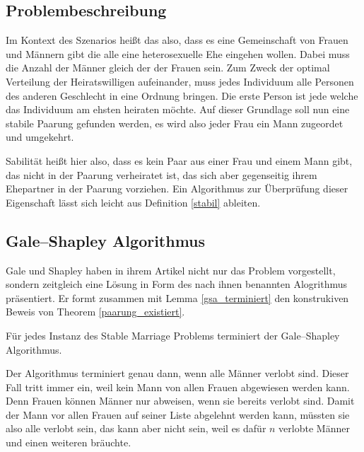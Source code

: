 \subsection{Problembeschreibung}

Im Kontext des Szenarios heißt das also, dass es eine Gemeinschaft von Frauen und Männern gibt die alle eine heterosexuelle Ehe eingehen wollen. Dabei muss die Anzahl der Männer gleich der der Frauen sein. Zum Zweck der optimal Verteilung der Heiratswilligen aufeinander, muss jedes Individuum alle Personen des anderen Geschlecht in eine Ordnung bringen. Die erste Person ist jede welche das Individuum am ehsten heiraten möchte. Auf dieser Grundlage soll nun eine stabile Paarung gefunden werden, es wird also jeder Frau ein Mann zugeordet und umgekehrt.

Sabilität heißt hier also, dass es kein Paar aus einer Frau und einem Mann gibt, das nicht in der Paarung verheiratet ist, das sich aber gegenseitig ihrem Ehepartner in der Paarung vorziehen. Ein Algorithmus zur Überprüfung dieser Eigenschaft lässt sich leicht aus Definition \ref{stabil} ableiten.



\subsection{Gale–Shapley Algorithmus}

Gale und Shapley haben in ihrem Artikel \cite{Gale:1962} nicht nur das Problem vorgestellt, sondern zeitgleich eine Lösung in Form des nach ihnen benannten Alogrithmus präsentiert. Er formt zusammen mit Lemma \ref{gsa_terminiert} den konstrukiven Beweis von Theorem \ref{paarung_existiert}.



\begin{Lemma}
\label{gsa_terminiert}
  Für jedes Instanz des Stable Marriage Problems terminiert der Gale–Shapley Algorithmus.
\end{Lemma}

\begin{Beweis}
\label{gsa_terminiert_bew}
  Der Algorithmus terminiert genau dann, wenn alle Männer verlobt sind. Dieser Fall tritt immer ein, weil kein Mann von allen Frauen abgewiesen werden kann. Denn Frauen können Männer nur abweisen, wenn sie bereits verlobt sind. Damit der Mann vor allen Frauen auf seiner Liste abgelehnt werden kann, müssten sie also alle verlobt sein, das kann aber nicht sein, weil es dafür $n$ verlobte Männer und einen weiteren bräuchte.
\end{Beweis}

